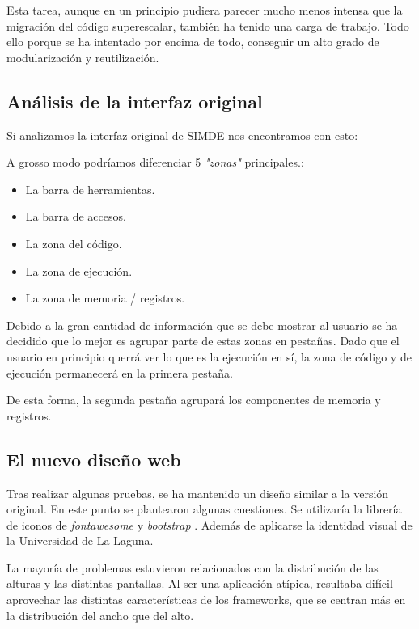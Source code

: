 Esta tarea, aunque en un principio pudiera parecer mucho menos intensa que la migración del código 
superescalar, también ha tenido una carga de trabajo. Todo ello porque se ha intentado por encima 
de todo, conseguir un alto grado de modularización y reutilización. 

\subsection{Análisis de la interfaz original}

Si analizamos la interfaz original de SIMDE nos encontramos con esto: 

A grosso modo podríamos diferenciar 5 \textit{"zonas"} principales.:

\begin{itemize}

\item La barra de herramientas.

\item La barra de accesos.

\item La zona del código.

\item La zona de ejecución.

\item La zona de memoria / registros. 

\end{itemize}

Debido a la gran cantidad de información que se debe mostrar al usuario se ha decidido que lo mejor 
es agrupar parte de estas zonas en pestañas. Dado que el usuario en principio querrá ver lo que es 
la ejecución en sí, la zona de código y de ejecución permanecerá en la primera pestaña.

\bigskip
De esta forma, la segunda pestaña agrupará los componentes de memoria y registros.

\subsection{El nuevo diseño web}

Tras realizar algunas pruebas, se ha mantenido un diseño similar a la versión original. En este punto
se plantearon algunas cuestiones. Se utilizaría la librería de iconos de \textit{fontawesome} 
\cite{fontawesome} y \textit{bootstrap} \cite{bootstrap}.
Además de aplicarse la identidad visual de la Universidad de La Laguna.

\bigskip
La mayoría de problemas estuvieron relacionados con la distribución de las alturas y las distintas pantallas.
Al ser una aplicación atípica, resultaba difícil aprovechar las distintas características de los frameworks, 
que se centran más en la distribución del ancho que del alto.

